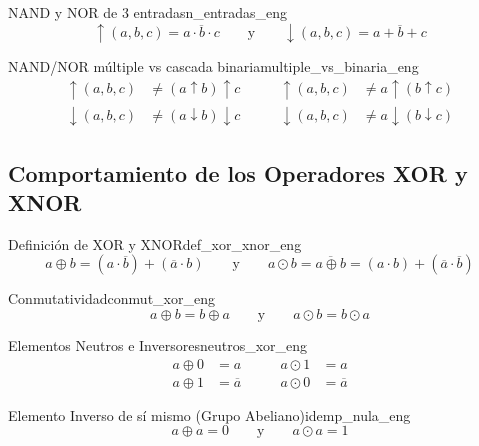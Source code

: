 \setcounter{tcb@cnt@definicion}{6}
\begin{definicion}{NAND y NOR de 3 entradas}{n_entradas_eng}
\[ \uparrow(a,b,c) = \overline{a \cdot b \cdot c} \qquad \text{y} \qquad \downarrow(a,b,c) = \overline{a + b + c} \]
\end{definicion}

\setcounter{tcb@cnt@teorema}{20}
\begin{teorema}{NAND/NOR múltiple vs cascada binaria}{multiple_vs_binaria_eng}
\begin{align*}
    \uparrow(a,b,c) &\neq (a \uparrow b) \uparrow c \qquad & \uparrow(a,b,c) &\neq a \uparrow (b \uparrow c) \\
    \downarrow(a,b,c) &\neq (a \downarrow b) \downarrow c \qquad & \downarrow(a,b,c) &\neq a \downarrow (b \downarrow c)
\end{align*}
\end{teorema}
\subsection*{Comportamiento de los Operadores XOR y XNOR}

\setcounter{tcb@cnt@definicion}{4}
\begin{definicion}{Definición de XOR y XNOR}{def_xor_xnor_eng}
\[ a \oplus b = (a \cdot \overline{b}) + (\overline{a} \cdot b) \qquad \text{y} \qquad a \odot b = \overline{a \oplus b} = (a \cdot b) + (\overline{a} \cdot \overline{b}) \]
\end{definicion}

\setcounter{tcb@cnt@teorema}{22}
\begin{teorema}{Conmutatividad}{conmut_xor_eng}
\[ a \oplus b = b \oplus a \qquad \text{y} \qquad a \odot b = b \odot a \]
\end{teorema}

\setcounter{tcb@cnt@teorema}{23}
\begin{teorema}{Elementos Neutros e Inversores}{neutros_xor_eng}
\begin{align*}
    a \oplus 0 &= a \qquad & a \odot 1 &= a \\
    a \oplus 1 &= \overline{a} \qquad & a \odot 0 &= \overline{a}
\end{align*}
\end{teorema}

\setcounter{tcb@cnt@teorema}{24}
\begin{teorema}{Elemento Inverso de sí mismo (Grupo Abeliano)}{idemp_nula_eng}
\[ a \oplus a = 0 \qquad \text{y} \qquad a \odot a = 1 \]
\end{teorema}


